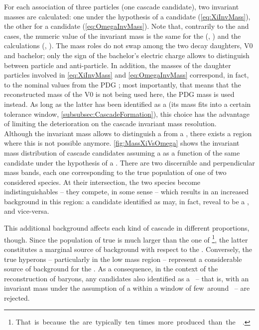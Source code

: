 For each association of three particles (\ie one cascade candidate), two invariant masses are calculated: one under the hypothesis of a \rmXiPM candidate (\eq\ref{eq:XiInvMass}), the other for a \rmOmegaPM candidate (\eq\ref{eq:OmegaInvMass}). Note that, contrarily to the \rmLambda and \rmAlambda cases, the numeric value of the invariant mass is the same for the  (\rmXiM, \rmOmegaM) and the  calculations (\rmAxiP, \rmAomegaP). The mass roles do not swap among the two decay daughters, V0 and bachelor; only the sign of the bachelor's electric charge allows to distinguish between particle and anti-particle. In addition, the masses of the daughter particles involved in \eq\ref{eq:XiInvMass} and \ref{eq:OmegaInvMass} correspond, in fact, to the nominal values from the PDG \cite{particledatagroupReviewParticlePhysics2022}; most importantly, that means that the reconstructed mass of the V0 is not being used here, \ie the PDG mass \mPDG[\rmLambda] is used instead. As long as the latter has been identified as a \rmLambdaPM (\ie its mass fits into a certain tolerance window, \Sec\ref{subsubsec:CascadeFormation}), this choice has the advantage of limiting the deterioration on the cascade invariant mass resolution. \\

Although the invariant mass allows to distinguish a \rmXiPM from a \rmOmegaPM, there exists a region where this is not possible anymore. \Fig\ref{fig:MassXiVsOmega} shows the invariant mass distribution of cascade candidates assuming a \rmOmegaM as a function of the same candidate under the hypothesis of a \rmXiM. There are two discernible and perpendicular mass bands, each one corresponding to the true population of one of two considered species. At their intersection, the two species become indistinguishables -- they compete, in some sense -- which results in an increased background in this region: a candidate identified as \rmXiM may, in fact, reveal to be a \rmOmegaM, and vice-versa.

This additional background affects each kind of cascade in different proportions, though. Since the population of true \rmXiM is much larger than the one of \mbox{\rmOmegaM\footnote{That is because the \rmXi are typically ten times more produced than the \rmOmega~\cite{alicecollaborationProductionLightflavorHadrons2021}.}}, the latter constitutes a marginal source of background with respect to the \rmXiM. Conversely, the true \rmXiM hyperons -- particularly in the low mass region -- represent a considerable source of background for the \rmOmegaM. As a consequence, in the context of the reconstruction of \rmOmegaPM baryons, any candidates also identified as a \rmXiPM\ -- that is, with an invariant mass under the assumption of a \rmXiPM within a window of few~\mmass around \mPDG[\rmXi]\ -- are rejected.

